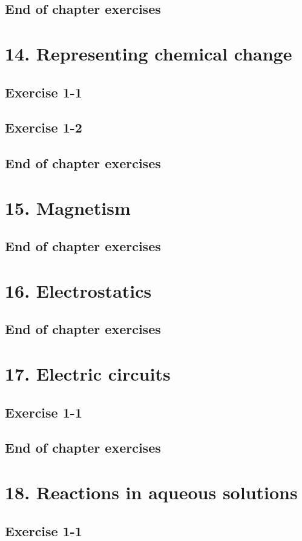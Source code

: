 \begin{enumerate}[label=\textbf{\arabic*}., itemsep=5pt]
\subsection{End of chapter exercises}
\section{14. Representing chemical change}
\subsection{Exercise 1-1}
\subsection{Exercise 1-2}
\subsection{End of chapter exercises}
\section{15. Magnetism}
\subsection{End of chapter exercises}
\section{16. Electrostatics}
\subsection{End of chapter exercises}
\section{17. Electric circuits}
\subsection{Exercise 1-1}
\subsection{End of chapter exercises}
\section{18. Reactions in aqueous solutions}
\subsection{Exercise 1-1}

\end{enumerate}
